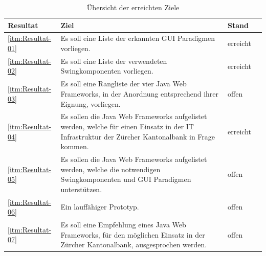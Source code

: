   \begin{table}[p]
    \sffamily 
    \begin{center}
      \begin{tabular}{lp{9cm}ll}
        \toprule
        \textbf{Resultat} & \textbf{Ziel} & \textbf{Stand} \\
        \midrule
        \ref{itm:Resultat-01} &
          Es soll eine Liste der erkannten GUI Paradigmen vorliegen. &
          erreicht\\
        \ref{itm:Resultat-02} &
          Es soll eine Liste der verwendeten Swingkomponenten vorliegen. &
          erreicht\\
        \ref{itm:Resultat-03} &
          Es soll eine Rangliste der vier Java Web Frameworks, in der Anordnung
          entsprechend ihrer Eignung, vorliegen. &
          offen\\
        \ref{itm:Resultat-04} &
          Es sollen die Java Web Frameworks aufgelistet werden, welche für
          einen Einsatz in der IT Infrastruktur der Zürcher Kantonalbank in
          Frage kommen. &
          erreicht\\
        \ref{itm:Resultat-05} &
          Es sollen die Java Web Frameworks aufgelistet werden, welche die
          notwendigen Swingkomponenten und GUI Paradigmen unterstützen. &
          offen\\
        \ref{itm:Resultat-06} &
          Ein lauffähiger Prototyp. &
          offen\\
        \ref{itm:Resultat-07} &
          Es soll eine Empfehlung eines Java Web Frameworks, für den möglichen
          Einsatz in der Zürcher Kantonalbank, ausgesprochen werden. &
          offen\\
        \bottomrule
      \end{tabular}
      \caption{Übersicht der erreichten Ziele}
      \label{tab:erreichteZiele}
    \end{center}
  \end{table}